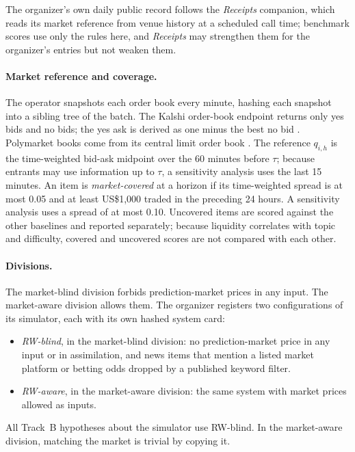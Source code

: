 \documentclass[11pt]{article}
\begin{document}
The organizer's own daily public record follows the \emph{Receipts} companion, which reads its market reference from venue history at a scheduled call time; benchmark scores use only the rules here, and \emph{Receipts} may strengthen them for the organizer's entries but not weaken them.

\paragraph{Market reference and coverage.} The operator snapshots each order book every minute, hashing each snapshot into a sibling tree of the batch. The Kalshi order-book endpoint returns only yes bids and no bids; the yes ask is derived as one minus the best no bid \citep{kalshi2026orderbook}. Polymarket books come from its central limit order book \citep{polymarket2026books}. The reference $q_{i,h}$ is the time-weighted bid-ask midpoint over the 60 minutes before $\tau$; because entrants may use information up to $\tau$, a sensitivity analysis uses the last 15 minutes. An item is \emph{market-covered} at a horizon if its time-weighted spread is at most 0.05 and at least US\$1{,}000 traded in the preceding 24 hours. A sensitivity analysis uses a spread of at most 0.10. Uncovered items are scored against the other baselines and reported separately; because liquidity correlates with topic and difficulty, covered and uncovered scores are not compared with each other.

\paragraph{Divisions.} The market-blind division forbids prediction-market prices in any input. The market-aware division allows them. The organizer registers two configurations of its simulator, each with its own hashed system card:
\begin{itemize}
  \item \emph{RW-blind}, in the market-blind division: no prediction-market price in any input or in assimilation, and news items that mention a listed market platform or betting odds dropped by a published keyword filter.
  \item \emph{RW-aware}, in the market-aware division: the same system with market prices allowed as inputs.
\end{itemize}
All Track~B hypotheses about the simulator use RW-blind. In the market-aware division, matching the market is trivial by copying it.
\end{document}
